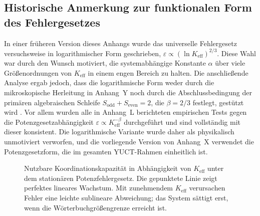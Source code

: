 \documentclass[12pt,a4paper]{article}
\theoremstyle{remark}
\begin{document}
	\subsection*{Historische Anmerkung zur funktionalen Form des Fehlergesetzes}
	
	In einer früheren Version dieses Anhangs wurde das universelle Fehlergesetz versuchsweise in logarithmischer Form geschrieben, \( \varepsilon \propto (\ln K_{\mathrm{eff}})^{2/3} \). Diese Wahl war durch den Wunsch motiviert, die systemabhängige Konstante \(\alpha\) über viele Größenordnungen von \(K_{\mathrm{eff}}\) in einem engen Bereich zu halten. Die anschließende Analyse ergab jedoch, dass die logarithmische Form weder durch die mikroskopische Herleitung in Anhang~Y noch durch die Abschlussbedingung der primären algebraischen Schleife \(S_{\mathrm{odd}}+S_{\mathrm{even}}=2\), die \(\beta=2/3\) festlegt, gestützt wird \cite{YakushevLaw2026}. Vor allem wurden alle in Anhang~L berichteten empirischen Tests gegen die Potenzgesetzabhängigkeit \(\varepsilon \propto K_{\mathrm{eff}}^{-\beta}\) durchgeführt und sind vollständig mit dieser konsistent. Die logarithmische Variante wurde daher als physikalisch unmotiviert verworfen, und die vorliegende Version von Anhang~X verwendet die Potenzgesetzform, die im gesamten YUCT-Rahmen einheitlich ist.
	
	\begin{figure}[htbp]
		\centering
		\caption{Nutzbare Koordinationskapazität in Abhängigkeit von \(K_{\mathrm{eff}}\) unter dem stationären Potenzfehlergesetz. Die gepunktete Linie zeigt perfektes lineares Wachstum. Mit zunehmendem \(K_{\mathrm{eff}}\) verursachen Fehler eine leichte sublineare Abweichung; das System sättigt erst, wenn die Wörterbuchgrößengrenze erreicht ist.}
		\label{fig:keff-phase}
	\end{figure}
	
\end{document}
